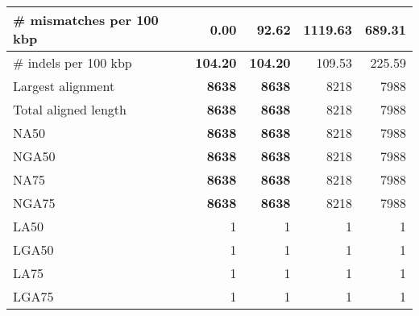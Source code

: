 \documentclass[12pt,a4paper]{article}
\begin{document}
\begin{table}[ht]
\begin{center}
\begin{tabular}{|l*{4}{|r}|}
\# mismatches per 100 kbp & {\bf 0.00} & 92.62 & 1119.63 & 689.31 \\ \hline
\# indels per 100 kbp & {\bf 104.20} & {\bf 104.20} & 109.53 & 225.59 \\ \hline
Largest alignment & {\bf 8638} & {\bf 8638} & 8218 & 7988 \\ \hline
Total aligned length & {\bf 8638} & {\bf 8638} & 8218 & 7988 \\ \hline
NA50 & {\bf 8638} & {\bf 8638} & 8218 & 7988 \\ \hline
NGA50 & {\bf 8638} & {\bf 8638} & 8218 & 7988 \\ \hline
NA75 & {\bf 8638} & {\bf 8638} & 8218 & 7988 \\ \hline
NGA75 & {\bf 8638} & {\bf 8638} & 8218 & 7988 \\ \hline
LA50 & 1 & 1 & 1 & 1 \\ \hline
LGA50 & 1 & 1 & 1 & 1 \\ \hline
LA75 & 1 & 1 & 1 & 1 \\ \hline
LGA75 & 1 & 1 & 1 & 1 \\ \hline
\end{tabular}
\end{center}
\end{table}
\end{document}
